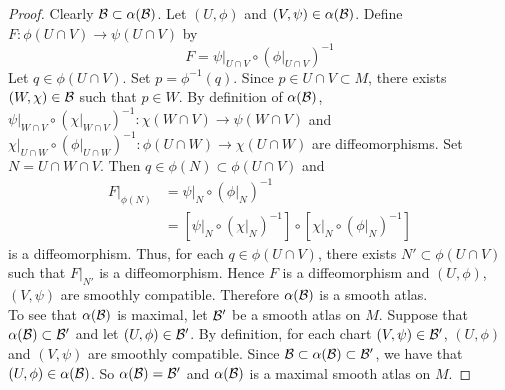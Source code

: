 \documentclass{book}
\begin{document}
	\begin{proof}
		Clearly $\mathcal{B} \subset \alpha(\mathcal{B})$. Let $(U, \phi)$ and $(V, \psi) \in \alpha(\mathcal{B})$. Define $F: \phi(U \cap V) \rightarrow \psi (U \cap V)$ by 
		$$F = \psi|_{U \cap V} \circ (\phi|_{U \cap V})^{-1}$$
		Let $q \in \phi(U \cap V)$. Set $p = \phi^{-1}(q)$. Since $p \in U \cap V \subset M$, there exists $(W, \chi) \in \mathcal{B}$ such that $p \in W$. By definition of $\alpha(\mathcal{B})$, $\psi|_{W \cap V} \circ (\chi|_{W \cap V})^{-1} : \chi(W \cap V) \rightarrow \psi(W \cap V)$ and $ \chi|_{U \cap W} \circ (\phi|_{U \cap W})^{-1} : \phi(U \cap W) \rightarrow \chi(U \cap W)$ are diffeomorphisms. Set $N = U \cap W \cap V$. Then $q \in \phi(N) \subset \phi(U \cap V)$ and 
		\begin{align*}
			F|_{\phi(N)}
			& = \psi|_{N} \circ (\phi|_{N})^{-1} \\
			& = [\psi|_{N} \circ (\chi|_{N})^{-1}] \circ [\chi|_{N} \circ (\phi|_{N})^{-1}]
		\end{align*}
		is a diffeomorphism. 
		Thus, for each $q \in \phi(U \cap V)$, there exists $N' \subset \phi(U \cap V)$ such that $F|_{N'}$ is a diffeomorphism. Hence $F$ is a diffeomorphism and $(U, \phi)$, $(V, \psi)$ are smoothly compatible. Therefore $\alpha(\mathcal{B})$ is a smooth atlas.\\
		To see that $\alpha(\mathcal{B})$ is maximal, let $\mathcal{B}'$ be a smooth atlas on $M$. Suppose that $\alpha(\mathcal{B}) \subset \mathcal{B}'$ and let $(U, \phi) \in \mathcal{B}'$. By definition, for each chart $(V, \psi) \in \mathcal{B}'$, $(U, \phi)$ and $(V, \psi)$ are smoothly compatible. Since $\mathcal{B} \subset \alpha(\mathcal{B}) \subset \mathcal{B}'$, we have that $(U, \phi) \in \alpha(\mathcal{B})$. So $\alpha(\mathcal{B}) = \mathcal{B}'$ and $\alpha(\mathcal{B})$ is a maximal smooth atlas on $M$.
	\end{proof}
\end{document}
